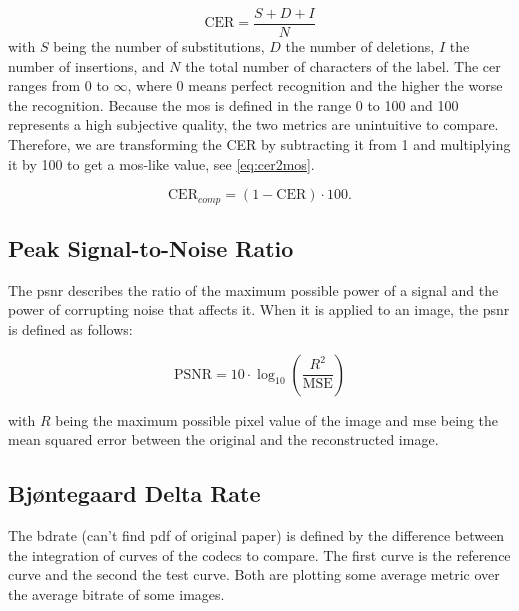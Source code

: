 \begin{equation}
    \text{CER} = \frac{S + D + I}{N}
    \label{eq:cer}
\end{equation}
with \(S\) being the number of substitutions, \(D\) the number of deletions, \(I\) the number of insertions, and \(N\) the total number of characters of the label.
The \gls{cer} ranges from 0 to $\infty$, where 0 means perfect recognition and the higher the worse the recognition.
Because the \gls{mos} is defined in the range 0 to 100 and 100 represents a high subjective quality, the two metrics are unintuitive to compare.
Therefore, we are transforming the CER by subtracting it from 1 and multiplying it by 100 to get a \gls{mos}-like value, see \autoref{eq:cer2mos}.

\begin{equation}
    \text{CER}_{comp} = (1 - \text{CER}) \cdot 100.
    \label{eq:cer2mos}
\end{equation}

\subsection{Peak Signal-to-Noise Ratio}
\label{subsec:psnr}

The \gls{psnr} \cite{PSNRvsSSIM_2010} describes the ratio of the maximum possible power of a signal and the power of corrupting noise that affects it.
When it is applied to an image, the \gls{psnr} is defined as follows:

\begin{equation}
    \text{PSNR} = 10 \cdot \log_{10} \left( \frac{R^2}{\text{MSE}} \right)
    \label{eq:psnr}
\end{equation}

with \(R\) being the maximum possible pixel value of the image and \gls{mse} being the mean squared error between the original and the reconstructed image.

\subsection{Bjøntegaard Delta Rate}
\label{subsec:bdrate}

The \gls{bdrate} \cite{bdrate_original_2001}\cite{bdrate_beyond_2022} (can't find pdf of original paper) is defined by the difference between the integration of curves of the codecs to compare.
The first curve is the reference curve and the second the test curve.
Both are plotting some average metric over the average bitrate of some images.

